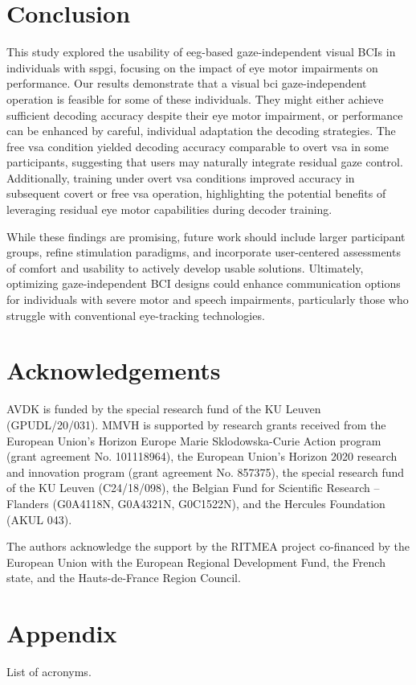 \documentclass[twocolumn]{article}
\begin{document}
\section{Conclusion}
This study explored the usability of \ac{eeg}-based gaze-independent visual BCIs in
individuals with \ac{sspgi}, focusing on the impact of eye motor impairments
on performance.
Our results demonstrate that a visual \ac{bci} gaze-independent operation is feasible
for some of these individuals.
They might either achieve sufficient decoding accuracy despite their eye
motor impairment, or performance can be enhanced by careful, individual
adaptation the decoding strategies.
The free \ac{vsa} condition yielded decoding accuracy comparable to overt \ac{vsa} in some participants, suggesting that users may naturally integrate residual gaze control.
Additionally, training under overt \ac{vsa} conditions improved accuracy in
subsequent covert or free \ac{vsa} operation, highlighting the potential benefits of
leveraging residual eye motor capabilities during decoder training.

While these findings are promising, future work should include larger
participant groups, refine stimulation paradigms, and incorporate
user-centered assessments of comfort and usability to actively develop usable
solutions.
Ultimately, optimizing gaze-independent BCI designs could enhance communication
options for individuals with severe motor and speech impairments, particularly
those who struggle with conventional eye-tracking technologies.


\section*{Acknowledgements}
AVDK is funded by the special research fund of the KU Leuven (GPUDL/20/031).
MMVH is supported by research grants received from the European Union’s
Horizon Europe Marie Sklodowska-Curie Action program
(grant agreement No. 101118964), the European Union’s Horizon 2020 research and
innovation program (grant agreement No. 857375), the special research fund of
the KU Leuven (C24/18/098), the Belgian Fund for Scientific Research – Flanders
(G0A4118N, G0A4321N, G0C1522N), and the Hercules Foundation (AKUL 043).

The authors acknowledge the support by the RITMEA project co-financed by the
European Union with the European Regional Development Fund, the French state,
and the Hauts-de-France Region Council.

\appendix
\section*{Appendix}
\setcounter{table}{0}
\renewcommand{\thetable}{A\arabic{table}}
\begin{table}[h]
	\footnotesize
	\printacronyms[template=tabular, heading=none]%
	\caption{List of acronyms.}%
\end{table}
\printbibliography
\end{document}
